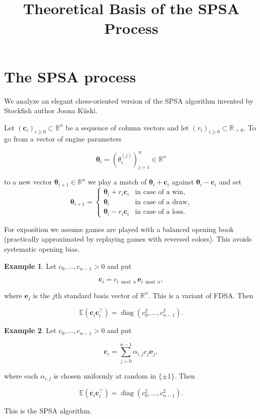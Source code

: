 \documentclass[11pt]{article}
\title{Theoretical Basis of the SPSA Process}
\author{}
\date{}
\theoremstyle{plain}
\theoremstyle{definition}
\newtheorem{example}{Example}
\theoremstyle{remark}
\newcommand{\R}{\mathbb{R}}
\newcommand{\E}{\mathbb{E}}
\DeclareMathOperator{\diag}{diag}
\begin{document}
\maketitle

\section{The SPSA process}

We analyze an elegant chess-oriented version of the SPSA algorithm invented by
Stockfish author Joona Kiiski.

Let $(\bm{c}_i)_{i\ge 0}\subset\R^n$ be a sequence of column vectors and let
$(r_i)_{i\ge 0}\subset\R_{>0}$. To go from a vector of engine parameters

\[
  \bm{\theta}_i=(\theta_i^{(j)})_{j=1}^n\in\R^n
\]

to a new vector $\bm{\theta}_{i+1}\in\R^n$ we play a match of
$\bm{\theta}_i+\bm{c}_i$ against $\bm{\theta}_i-\bm{c}_i$ and set
\begin{equation}
  \bm{\theta}_{i+1} =
  \begin{cases}
    \bm{\theta}_i + r_i \bm{c}_i & \text{in case of a win},\\[4pt]
    \bm{\theta}_i                & \text{in case of a draw},\\[4pt]
    \bm{\theta}_i - r_i \bm{c}_i & \text{in case of a loss.}
  \end{cases}
  \label{eq:update}
\end{equation}

For exposition we assume games are played with a balanced opening book
(practically approximated by replaying games with reversed colors). This avoids
systematic opening bias.

\begin{example}\label{ex:fdsa}
Let $c_0,\dots,c_{n-1}>0$ and put

\[
  \bm{c}_i = c_{i\bmod n}\,\bm{e}_{i\bmod n},
\]

where $\bm{e}_j$ is the $j$th standard basis vector of $\R^n$. This is a
variant of FDSA. Then

\[
  \E(\bm{c}_i\bm{c}_i^\top)=\diag(c_0^2,\dots,c_{n-1}^2).
\]
\end{example}

\begin{example}\label{ex:spsa}
Let $c_0,\dots,c_{n-1}>0$ and put

\[
  \bm{c}_i=\sum_{j=0}^{n-1}\alpha_{i,j}c_j\bm{e}_j,
\]

where each $\alpha_{i,j}$ is chosen uniformly at random in $\{\pm1\}$. Then

\[
  \E(\bm{c}_i\bm{c}_i^\top)=\diag(c_0^2,\dots,c_{n-1}^2).
\]

This is the SPSA algorithm.
\end{example}
\end{document}
